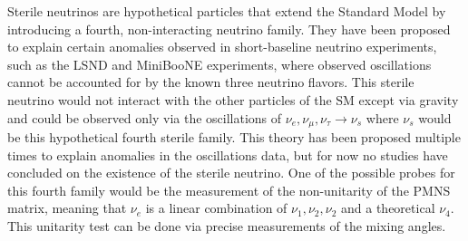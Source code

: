 Sterile neutrinos are hypothetical particles that extend the Standard Model by introducing a fourth, non-interacting neutrino family. They have been proposed to explain certain anomalies observed in short-baseline neutrino experiments, such as the LSND \cite{lsnd_collaboration_evidence_2001} and MiniBooNE \cite{miniboone_collaboration_significant_2018} experiments, where observed oscillations cannot be accounted for by the known three neutrino flavors.
This sterile neutrino would not interact with the other particles of the SM except via gravity and could be observed only via the oscillations of $\nu_e,\nu_\mu,\nu_\tau \rightarrow \nu_s$ where $\nu_s$ would be this hypothetical fourth sterile family. This theory has been proposed multiple times to explain anomalies in the oscillations data, but for now no studies have concluded on the existence of the sterile neutrino. One of the possible probes for this fourth family would be the measurement of the non-unitarity of the PMNS matrix, meaning that $\nu_e$ is a linear combination of $\nu_1, \nu_2, \nu_2$ and a theoretical $\nu_4$. This unitarity test can be done via precise measurements of the mixing angles.

